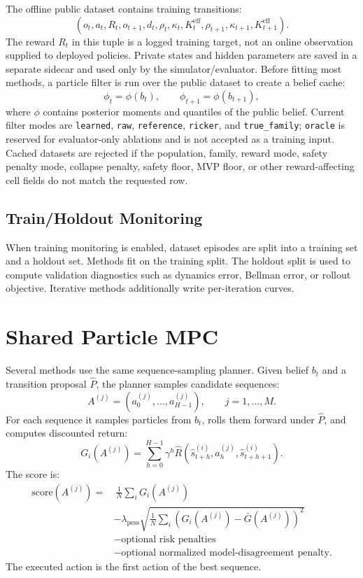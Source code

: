 \documentclass[11pt]{article}
\newcommand{\code}[1]{\texttt{#1}}
\newcommand{\1}{\mathbf{1}}
\begin{document}
The offline public dataset contains training transitions:
\[
  (o_t,a_t,R_t,o_{t+1},d_t,\rho_t,\kappa_t,K^{\mathrm{eff}}_t,
   \rho_{t+1},\kappa_{t+1},K^{\mathrm{eff}}_{t+1}).
\]
The reward $R_t$ in this tuple is a logged training target, not an online
observation supplied to deployed policies.  Private states and hidden parameters
are saved in a separate sidecar and used only by the simulator/evaluator.
Before fitting most methods, a particle filter is run over the public dataset to
create a belief cache:
\[
  \phi_t=\phi(b_t),\qquad \phi_{t+1}=\phi(b_{t+1}),
\]
where $\phi$ contains posterior moments and quantiles of the public belief.
Current filter modes are \code{learned}, \code{raw}, \code{reference},
\code{ricker}, and \code{true\_family}; \code{oracle} is reserved for
evaluator-only ablations and is not accepted as a training input.  Cached
datasets are rejected if the population, family, reward mode, safety penalty
mode, collapse penalty, safety floor, MVP floor, or other reward-affecting cell
fields do not match the requested row.

\subsection{Train/Holdout Monitoring}

When training monitoring is enabled, dataset episodes are split into a training
set and a holdout set.  Methods fit on the training split.  The holdout split is
used to compute validation diagnostics such as dynamics error, Bellman error, or
rollout objective.  Iterative methods additionally write per-iteration curves.

\section{Shared Particle MPC}

Several methods use the same sequence-sampling planner.  Given belief $b_t$ and
a transition proposal $\hat{P}$, the planner samples candidate sequences:
\[
  A^{(j)}=(a^{(j)}_0,\ldots,a^{(j)}_{H-1}),\qquad j=1,\ldots,M.
\]
For each sequence it samples particles from $b_t$, rolls them forward under
$\hat{P}$, and computes discounted return:
\[
  G_i(A^{(j)})=\sum_{h=0}^{H-1}\gamma^h
  \hat{R}(\hat{s}^{(i)}_{t+h},a^{(j)}_h,\hat{s}^{(i)}_{t+h+1}).
\]
The score is:
\[
\begin{aligned}
  \mathrm{score}(A^{(j)})
  =&\ \frac{1}{N}\sum_iG_i(A^{(j)})\\
  &-\lambda_{\mathrm{pess}}\sqrt{\frac{1}{N}\sum_i
      \left(G_i(A^{(j)})-\bar{G}(A^{(j)})\right)^2}\\
  &-\text{optional risk penalties}\\
  &-\text{optional normalized model-disagreement penalty}.
\end{aligned}
\]
The executed action is the first action of the best sequence.
\end{document}
